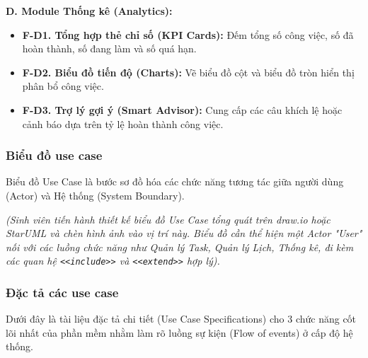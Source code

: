 \textbf{D. Module Thống kê (Analytics):}
\begin{itemize}
    \item \textbf{F-D1. Tổng hợp thẻ chỉ số (KPI Cards):} Đếm tổng số công việc, số đã hoàn thành, số đang làm và số quá hạn.
    \item \textbf{F-D2. Biểu đồ tiến độ (Charts):} Vẽ biểu đồ cột và biểu đồ tròn hiển thị phân bổ công việc.
    \item \textbf{F-D3. Trợ lý gợi ý (Smart Advisor):} Cung cấp các câu khích lệ hoặc cảnh báo dựa trên tỷ lệ hoàn thành công việc.
\end{itemize}

\subsubsection{Biểu đồ use case}
Biểu đồ Use Case là bước sơ đồ hóa các chức năng tương tác giữa người dùng (Actor) và Hệ thống (System Boundary). 

\textit{(Sinh viên tiến hành thiết kế biểu đồ Use Case tổng quát trên draw.io hoặc StarUML và chèn hình ảnh vào vị trí này. Biểu đồ cần thể hiện một Actor "User" nối với các luồng chức năng như Quản lý Task, Quản lý Lịch, Thống kê, đi kèm các quan hệ \texttt{<<include>>} và \texttt{<<extend>>} hợp lý).}

\subsubsection{Đặc tả các use case}

Dưới đây là tài liệu đặc tả chi tiết (Use Case Specifications) cho 3 chức năng cốt lõi nhất của phần mềm nhằm làm rõ luồng sự kiện (Flow of events) ở cấp độ hệ thống.


